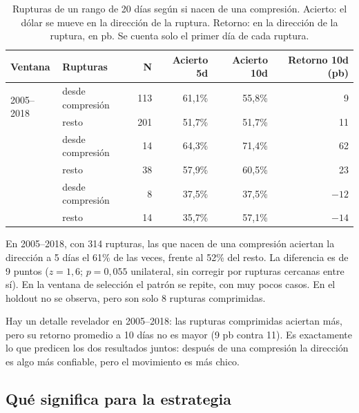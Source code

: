 \documentclass[10pt,a4paper]{article}
\begin{document}
\begin{table}[htbp]\centering\small
\begin{tabular}{@{}llrrrr@{}}
\toprule
Ventana & Rupturas & N & Acierto 5d & Acierto 10d & Retorno 10d (pb) \\
\midrule
\multirow{2}{*}{2005--2018} & desde compresión & 113 & 61{,}1\% & 55{,}8\% & 9 \\
                            & resto            & 201 & 51{,}7\% & 51{,}7\% & 11 \\
\addlinespace
\multirow{2}{*}{Selección}  & desde compresión & 14  & 64{,}3\% & 71{,}4\% & 62 \\
                            & resto            & 38  & 57{,}9\% & 60{,}5\% & 23 \\
\addlinespace
\multirow{2}{*}{Holdout (control)} & desde compresión & 8 & 37{,}5\% & 37{,}5\% & $-12$ \\
                            & resto            & 14  & 35{,}7\% & 57{,}1\% & $-14$ \\
\bottomrule
\end{tabular}
\caption{Rupturas de un rango de 20 días según si nacen de una compresión. Acierto:
el dólar se mueve en la dirección de la ruptura. Retorno: en la dirección de la
ruptura, en pb. Se cuenta solo el primer día de cada ruptura.}\label{tab:comp_dir}
\end{table}

En 2005--2018, con 314 rupturas, las que nacen de una compresión aciertan la
dirección a 5 días el 61\% de las veces, frente al 52\% del resto. La diferencia es
de 9 puntos ($z=1{,}6$; $p=0{,}055$ unilateral, sin corregir por rupturas cercanas
entre sí). En la ventana de selección el patrón se repite, con muy pocos casos. En
el holdout no se observa, pero son solo 8 rupturas comprimidas.

Hay un detalle revelador en 2005--2018: las rupturas comprimidas aciertan más, pero
su retorno promedio a 10 días no es mayor (9 pb contra 11). Es exactamente lo que
predicen los dos resultados juntos: después de una compresión la dirección es algo
más confiable, pero el movimiento es más chico.

\subsection{Qué significa para la estrategia}
\end{document}
